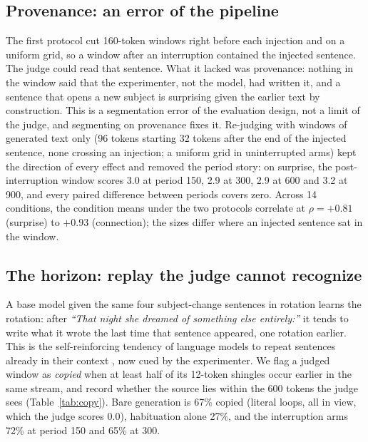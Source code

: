 \documentclass[11pt]{article}
\begin{document}
\subsection{Provenance: an error of the pipeline}

The first protocol cut 160-token windows right before each injection and on
a uniform grid, so a window after an interruption contained the injected
sentence. The judge could read that sentence. What it lacked was
provenance: nothing in the window said that the experimenter, not the
model, had written it, and a sentence that opens a new subject is surprising
given the earlier text by construction. This is a segmentation error of the
evaluation design, not a limit of the judge, and segmenting on provenance
fixes it. Re-judging with windows of generated text only (96 tokens starting
32 tokens after the end of the injected sentence, none crossing an
injection; a uniform grid in uninterrupted arms) kept the direction of every
effect and removed the period story: on surprise, the post-interruption
window scores 3.0 at period 150, 2.9 at 300, 2.9 at 600 and 3.2 at 900, and
every paired difference between periods covers zero. Across 14 conditions,
the condition means under the two protocols correlate at $\rho=+0.81$
(surprise) to $+0.93$ (connection); the sizes differ where an injected
sentence sat in the window.

\subsection{The horizon: replay the judge cannot recognize}
\label{sec:horizon}

A base model given the same four subject-change sentences in rotation
learns the rotation: after \emph{``That night she dreamed of something else
entirely:''} it tends to write what it wrote the last time that sentence
appeared, one rotation earlier. This is the self-reinforcing tendency of
language models to repeat sentences already in their context
\citep{xu2022loop}, now cued by the experimenter. We flag a judged window as
\emph{copied} when at least half of its 12-token shingles occur earlier in
the same stream, and record whether the source lies within the 600 tokens
the judge sees (Table~\ref{tab:copy}). Bare generation is 67\% copied
(literal loops, all in view, which the judge scores 0.0), habituation alone
27\%, and the interruption arms 72\% at period 150 and 65\% at 300.
\end{document}
